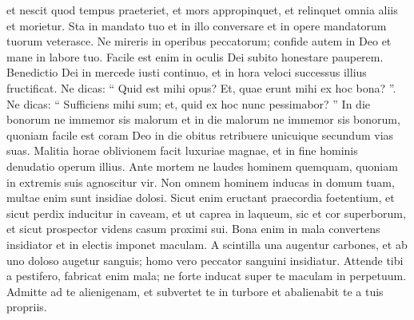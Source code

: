 \begin{biblechapter}
\begin{biblechapter}
\begin{biblechapter}
\begin{biblechapter}
\begin{biblechapter}
\begin{biblechapter}
\begin{biblechapter}
\begin{biblechapter}
\begin{biblechapter}
\begin{biblechapter}
\begin{biblechapter}
 \verse et nescit quod tempus praeteriet, et mors appropinquet,
 et relinquet omnia aliis et morietur.
 \verse Sta in mandato tuo et in illo conversare
 et in opere mandatorum tuorum veterasce.
 \verse Ne mireris in operibus peccatorum;
 confide autem in Deo et mane in labore tuo.
 \verse Facile est enim in oculis Dei subito honestare pauperem.
 \verse Benedictio Dei in mercede iusti continuo,
 et in hora veloci successus illius fructificat.
 \verse Ne dicas: “ Quid est mihi opus?
 Et, quae erunt mihi ex hoc bona? ”.
 \verse Ne dicas: “ Sufficiens mihi sum;
 et, quid ex hoc nunc pessimabor? ”
 \verse In die bonorum ne immemor sis malorum
 et in die malorum ne immemor sis bonorum,
 \verse quoniam facile est coram Deo in die obitus
 retribuere unicuique secundum vias suas.
 \verse Malitia horae oblivionem facit luxuriae magnae,
 et in fine hominis denudatio operum illius.
 \verse Ante mortem ne laudes hominem quemquam,
 quoniam in extremis suis agnoscitur vir.
 \verse Non omnem hominem inducas in domum tuam,
 multae enim sunt insidiae dolosi.
 \verse Sicut enim eructant praecordia foetentium,
 et sicut perdix inducitur in caveam,
 et ut caprea in laqueum, sic et cor superborum,
 et sicut prospector videns casum proximi sui.
 \verse Bona enim in mala convertens insidiator
 et in electis imponet maculam.
 \verse A scintilla una augentur carbones,
 et ab uno doloso augetur sanguis;
 homo vero peccator sanguini insidiatur.
 \verse Attende tibi a pestifero, fabricat enim mala;
 ne forte inducat super te maculam in perpetuum.
 \verse Admitte ad te alienigenam, et subvertet te in turbore
 et abalienabit te a tuis propriis.
 

\end{biblechapter}
\end{biblechapter}
\end{biblechapter}
\end{biblechapter}
\end{biblechapter}
\end{biblechapter}
\end{biblechapter}
\end{biblechapter}
\end{biblechapter}
\end{biblechapter}
\end{biblechapter}
